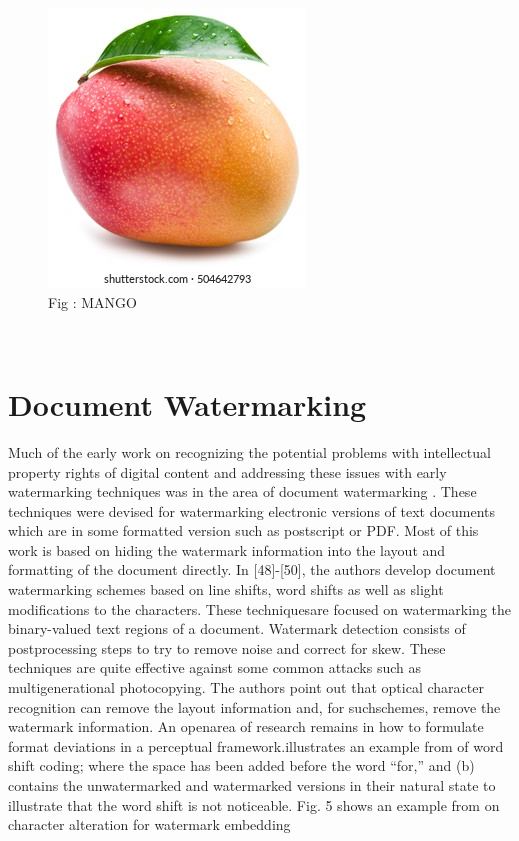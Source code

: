 \documentclass[12pt]{IEeetran}
\begin{document}
\begin{subfigure}{\linewidth}
\includegraphics[width=\linewidth]{mango}
\caption{Fig : MANGO}
\end{subfigure}\\


\section{Document Watermarking}
Much of the early work on recognizing the potential
problems with intellectual property rights of digital content and addressing these issues with early watermarking techniques was in the area of document watermarking . These techniques were devised for watermarking electronic versions of text documents which
are in some formatted version such as postscript or PDF.
Most of this work is based on hiding the watermark information into the layout and formatting of the document
directly. In [48]-[50], the authors develop document
watermarking schemes based on line shifts, word shifts as
well as slight modifications to the characters. These techniquesare focused on watermarking the binary-valued
text regions of a document. Watermark detection consists
of postprocessing steps to try to remove noise and correct
for skew. These techniques are quite effective against
some common attacks such as multigenerational photocopying. The authors point out that optical character recognition can remove the layout information and, for suchschemes, remove the watermark information. An openarea of research remains in how to formulate format deviations in a perceptual framework.illustrates an example from  of word shift coding; where
the space has been added before the word “for,” and (b)
contains the unwatermarked and watermarked versions
in their natural state to illustrate that the word shift is not
noticeable. Fig. 5 shows an example from on character alteration for watermark embedding
\end{document}
